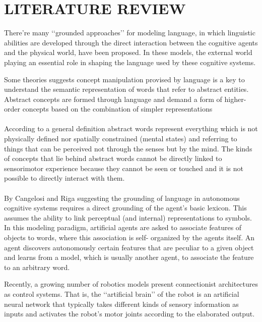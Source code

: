 \documentclass[12pt]{report}
\begin{document}
\chapter{LITERATURE REVIEW}

There're many ‘‘grounded approaches’’ for modeling language, in which linguistic abilities are developed through the direct interaction between the cognitive agents and the physical world, have been proposed. In these models, the external world playing an essential role in shaping the language used by these cognitive systems. 

Some theories \cite{1} suggests concept manipulation provised by language is a key to understand the semantic representation of words that refer to abstract entities. Abstract concepts are formed through language and demand a form of higher-order concepts based on the combination of simpler representations\\\\ 
According to a general definition \cite{2} abstract words represent everything which is not physically defined nor spatially constrained (mental states) and referring to things that can be perceived not through the senses but by the mind. The kinds of concepts that lie behind abstract words cannot be directly linked to sensorimotor experience because they cannot be seen or touched and it is not possible to directly interact with them.\\\\
By Cangelosi and Riga\cite{3} suggesting the grounding of language in autonomous cognitive systems requires a direct grounding of the agent’s basic lexicon. This assumes the ability to link perceptual (and internal) representations to symbols. In this modeling paradigm, artificial agents are asked to associate features of objects to words, where this association is self- organized by the agents itself. An agent discovers autonomously certain features that are peculiar to a given object and learns from a model, which is usually another agent, to associate the feature to an arbitrary word. 

Recently, a growing number of robotics models present connectionist architectures as control systems. That is, the ‘‘artificial brain’’ of the robot is an artificial neural network that typically takes different kinds of sensory information as inputs and activates the robot’s motor joints according to the elaborated output.\cite{4}



\end{document}
